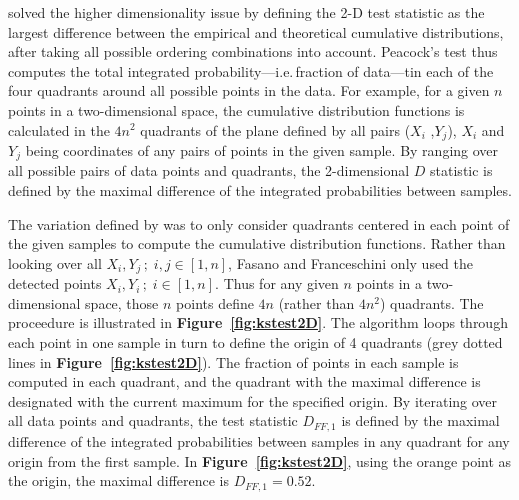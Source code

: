 \documentclass[codesnippet]{jss}
\begin{document}
\cite{Peacock1983} solved the higher dimensionality issue by defining
the 2-D test statistic as the largest difference between the empirical
and theoretical cumulative distributions, after taking all possible
ordering combinations into account. Peacock's test thus computes the
total integrated probability---i.e.\,fraction of data---tin each of
the four quadrants around all possible points in the data. For
example, for a given $n$ points in a two-dimensional space, the
cumulative distribution functions is calculated in the $4n^2$
quadrants of the plane defined by all pairs ($X_i$ ,$Y_j$), $X_i$ and
$Y_j$ being coordinates of any pairs of points in the given sample. By
ranging over all possible pairs of data points and quadrants, the
2-dimensional $D$ statistic is defined by the maximal difference of
the integrated probabilities between samples.

The variation defined by \cite{Fasano1987}  was to only consider
quadrants centered in each point of the given samples to compute the
cumulative distribution functions.  Rather than looking over all
$X_i, Y_j \,;\; i,j \in [1,n]$, Fasano and Franceschini only used the detected points
$X_i, Y_i \,;\; i \in [1,n]$.
Thus for any given $n$ points in a two-dimensional space, those $n$ points define $4n$ (rather than
$4n^2$) quadrants.  The proceedure is illustrated in \textbf{Figure~\ref{fig:kstest2D}}.
The algorithm loops through each point in one sample in turn to define
the origin of 4 quadrants (grey dotted lines in
\textbf{Figure~\ref{fig:kstest2D}}). The fraction of points in each
sample is computed in each quadrant, and the quadrant with the maximal
difference is designated with the current maximum for the specified
origin. By iterating over all data points and quadrants, the test
statistic $D_{FF,1}$ is defined by the maximal difference of the
integrated probabilities between samples in any quadrant for any
origin from the first sample.  In \textbf{Figure~\ref{fig:kstest2D}},
using the orange point as the origin, the maximal difference is
$D_{FF,1} = 0.52$.
\end{document}
